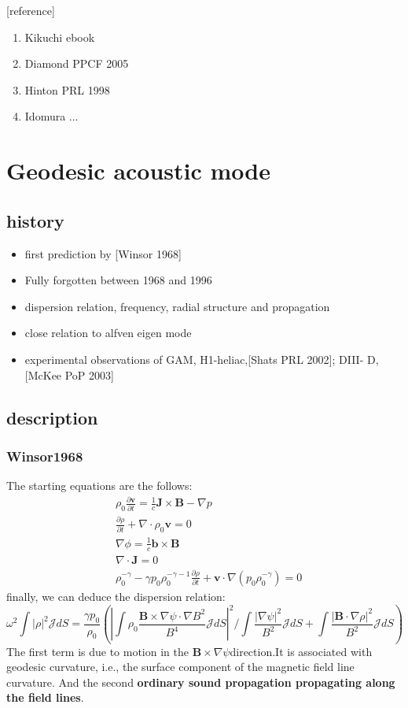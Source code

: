 \documentclass[11pt,a4paper]{article}
\begin{document}
	
	[reference]
	\begin{enumerate}
		\item Kikuchi ebook
		\item Diamond PPCF 2005
		\item Hinton PRL 1998
		\item Idomura ... 
	\end{enumerate}
	
	
\newpage	
\section{Geodesic acoustic mode}
\subsection{history}
	\begin{itemize}
		\item first prediction by [Winsor 1968]
		\item Fully forgotten between 1968 and 1996
		\item dispersion relation, frequency, radial structure and propagation
		\item close relation to alfven eigen mode
		\item experimental observations of GAM, H1-heliac,[Shats PRL 2002]; DIII-
		D, [McKee PoP 2003]
	\end{itemize}
	
\subsection{description}
	\subsubsection{Winsor1968}
	The starting equations are the follows:
	\begin{equation}
	\begin{aligned}
		&\rho_0\frac{\partial{\pmb{v}}}{\partial{t}}=\frac{1}{c}\pmb{J}\times\pmb{B}-\nabla{p}	\\
		&\frac{\partial\rho}{\partial{t}}+\nabla\cdot\rho_0\pmb{v}=0	\\
		&\nabla\phi=\frac{1}{c}\pmb{b}\times\pmb{B}	\\
		&\nabla\cdot\pmb{J}=0	\\
		&\rho_0^{-\gamma}-\gamma{p_0}\rho_0^{-\gamma-1}\frac{\partial{\rho}}{\partial{t}}+\pmb{v}\cdot\nabla({p_0}\rho_0^{-\gamma})=0
	\end{aligned}
	\end{equation}	
	finally, we can deduce the dispersion relation:
	\begin{equation}
		\omega^2\int{|\rho|^2}\mathcal{J}dS=\frac{\gamma{p_0}}{\rho_0}
		( |\int\rho_0\frac{\pmb{B}\times\nabla\psi\cdot\nabla{B^2}}{B^4}\mathcal{J}dS|^2/\int\frac{|\nabla\psi|^2}{B^2}\mathcal{J}dS + \int\frac{|\pmb{B}\cdot\nabla\rho|^2}{B^2}\mathcal{J}dS )
	\end{equation}
	The first term is due to motion in the $\pmb{B}\times\nabla\psi$direction.It is associated with geodesic curvature, i.e., the surface component of the magnetic field line curvature. And the second \textbf{ordinary sound propagation propagating along the field lines}.
	
\end{document}
